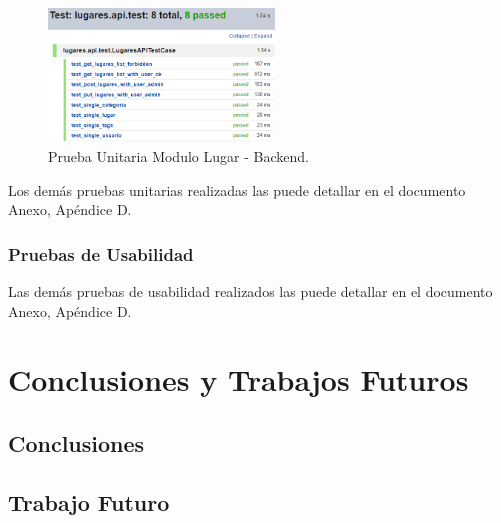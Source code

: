 \documentclass[12pt,letterpaper,openany]{book}
\begin{document}
\begin{figure}[H]
\begin{center}
\includegraphics[width=6cm]{./imagenes/Test/Backend/Test__lugares_api_test}
\caption{Prueba Unitaria Modulo Lugar - Backend.}
\end{center}
\end{figure}

Los demás pruebas unitarias realizadas las puede detallar en el documento Anexo, Apéndice D.

\subsection{Pruebas de Usabilidad}
Las demás pruebas de usabilidad realizados las puede detallar en el documento Anexo, Apéndice D.


\chapter{Conclusiones y Trabajos Futuros}\label{cap.conclu_trabajos}
\section{Conclusiones}
\section{Trabajo Futuro}
\end{document}
